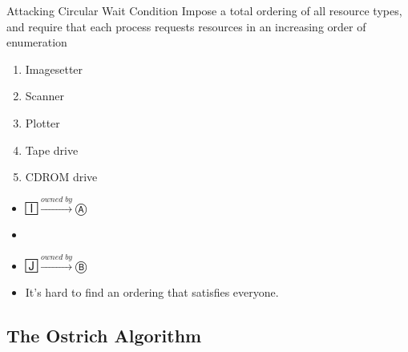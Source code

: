 \begin{frame}
  \begin{block}{Attacking Circular Wait Condition}
    Impose a total ordering of all resource types, and require that each process
    requests resources in an increasing order of enumeration 
  \end{block}
  \begin{center}
    \begin{minipage}{.3\linewidth}
      \begin{enumerate}
      \item Imagesetter
      \item Scanner
      \item Plotter
      \item Tape drive
      \item CDROM drive
      \end{enumerate}
    \end{minipage}\quad
    \begin{minipage}{.3\linewidth}\Large
      \begin{itemize}
      \item[] 🄸\(\xrightarrow{owned\;by}\)Ⓐ
      \item[] 
      \item[] 🄹\(\xrightarrow{owned\;by}\)Ⓑ
      \end{itemize}      
    \end{minipage}
  \end{center}
  \begin{itemize}
    \item[\textcolor{red}{🙁}] It's hard to find an ordering that satisfies everyone.
  \end{itemize}
\end{frame}

\subsection{The Ostrich Algorithm}
\label{sec:ostrich-algorithm}

